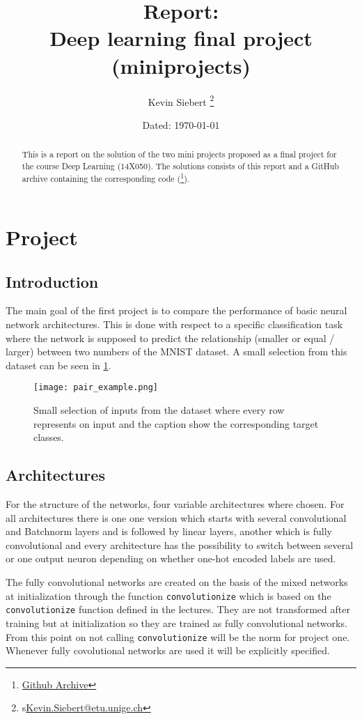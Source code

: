 \documentclass[11pt,english]{article}
\title{\textbf{Report: \\ Deep learning final project (miniprojects)}}
\author{Kevin Siebert%
	\thanks{\textsc{}s{\href{mailto:Kevin.Siebert@etu.unige.ch}{Kevin.Siebert@etu.unige.ch}}}}
\affil{Department of Informatics, Faculty of Science, \\ University of Geneva}
\date{Dated: \today}
\begin{document}
	\maketitle
	\vspace{-20pt}
	\begin{abstract}
		This is a report on the solution of the two mini projects proposed as a final project for the course Deep Learning (14X050). The solutions consists of this report and a GitHub archive containing the corresponding code (\thanks{\href{https://github.com/I-am-Rudi/DL_FinalProject}{Github Archive}}).
	\end{abstract}
	
	\section{Project} \label{sec:Proj1}
	\vspace{-10pt}
	\subsection{Introduction}
	The main goal of the first project is to compare the performance of basic neural network architectures. This is done with respect to a specific classification task where the network is supposed to predict the relationship (smaller or equal / larger) between two numbers of the MNIST dataset. A small selection from this dataset can be seen in \cref{fig:ex_pair}.
	
	\begin{figure}[H]
		\centering
		\texttt{[image: pair\_example.png]}
		\caption{Small selection of inputs from the dataset where every row represents on input and the caption show the corresponding target classes.}
		\label{fig:ex_pair}
	\end{figure} 


	\subsection{Architectures} \label{ssec:Architectures}
	For the structure of the networks, four variable architectures where chosen. For all architectures there is one one version which starts with several convolutional and Batchnorm layers and is followed by linear layers, another which is fully convolutional and every architecture has the possibility to switch between several or one output neuron depending on whether one-hot encoded labels are used. 
	
	The fully convolutional networks are created on the basis of the mixed networks at initialization through the function \lstinline|convolutionize| which is based on the \lstinline|convolutionize| function \cite{Fleuret2022} defined in the lectures. They are not transformed after training but at initialization so they are trained as fully convolutional networks. From this point on not calling  \lstinline|convolutionize| will be the norm for project one. Whenever fully covolutional networks are used it will be explicitly specified.
	
\end{document}
